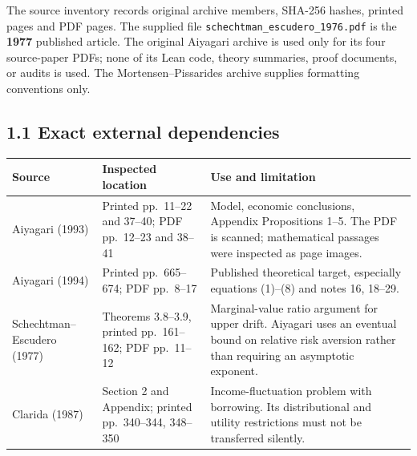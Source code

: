 \documentclass[
  11pt,
]{article}
\begin{document}
The source inventory records original archive members, SHA-256 hashes,
printed pages and PDF pages. The supplied file
\texttt{schechtman\_escudero\_1976.pdf} is the \textbf{1977} published
article. The original Aiyagari archive is used only for its four
source-paper PDFs; none of its Lean code, theory summaries, proof
documents, or audits is used. The Mortensen--Pissarides archive supplies
formatting conventions only.

\subsection{1.1 Exact external
dependencies}\label{exact-external-dependencies}

{\def\LTcaptype{} %
\begin{longtable}[]{@{}
  >{\raggedright\arraybackslash}p{}
  >{\raggedright\arraybackslash}p{}
  >{\raggedright\arraybackslash}p{}@{}}
\toprule\noalign{}
\begin{minipage}[b]{\linewidth}\raggedright
Source
\end{minipage} & \begin{minipage}[b]{\linewidth}\raggedright
Inspected location
\end{minipage} & \begin{minipage}[b]{\linewidth}\raggedright
Use and limitation
\end{minipage} \\
\midrule\noalign{}
\endhead
\bottomrule\noalign{}
\endlastfoot
Aiyagari (1993) & Printed pp.~11--22 and 37--40; PDF pp.~12--23 and
38--41 & Model, economic conclusions, Appendix Propositions 1--5. The
PDF is scanned; mathematical passages were inspected as page images. \\
Aiyagari (1994) & Printed pp.~665--674; PDF pp.~8--17 & Published
theoretical target, especially equations (1)--(8) and notes 16,
18--29. \\
Schechtman--Escudero (1977) & Theorems 3.8--3.9, printed pp.~161--162;
PDF pp.~11--12 & Marginal-value ratio argument for upper drift. Aiyagari
uses an eventual bound on relative risk aversion rather than requiring
an asymptotic exponent. \\
Clarida (1987) & Section 2 and Appendix; printed pp.~340--344, 348--350
& Income-fluctuation problem with borrowing. Its distributional and
utility restrictions must not be transferred silently. \\

\end{longtable}}
\end{document}
